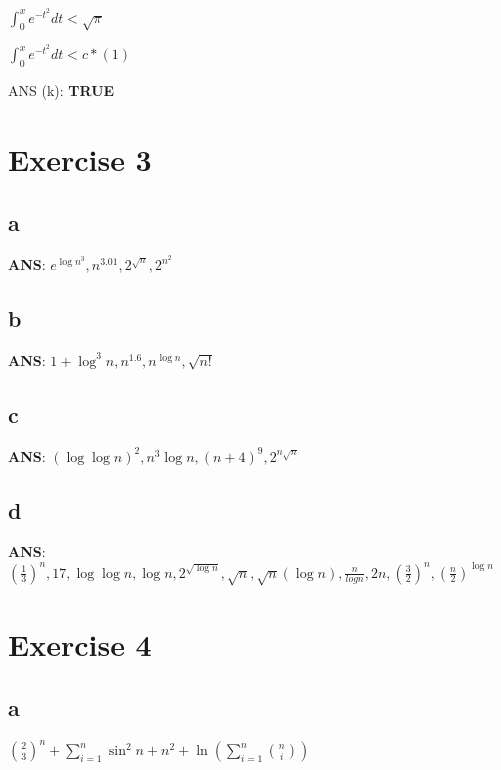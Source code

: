\documentclass[
]{article}
\begin{document}
\(\int_{0}^x e^{-t^2}dt < \sqrt{\pi}\)

\(\int_{0}^x e^{-t^2}dt < c*(1)\)

ANS (k): \textbf{TRUE}

\hypertarget{exercise-3}{%
\section{Exercise 3}\label{exercise-3}}

\hypertarget{a-2}{%
\subsection{a}\label{a-2}}

\textbf{ANS}: \({e^{\log{n^3}}}, n{^{3.01}}, 2^{\sqrt{n}},{2^{n^2}}\)

\hypertarget{b-2}{%
\subsection{b}\label{b-2}}

\textbf{ANS}: \(1+{\log^3{n}},{n^{{1.6}}},{n^{\log n}},{\sqrt{n!}}\)

\hypertarget{c-1}{%
\subsection{c}\label{c-1}}

\textbf{ANS}: \({(\log\log n)^2}, n^3\log{n}, (n+4)^9, 2^{n\sqrt{n}}\)

\hypertarget{d-1}{%
\subsection{d}\label{d-1}}

\textbf{ANS}:
\(({\frac{1}{3}})^n, 17, {\log \log n}, {\log n}, 2^{\sqrt{\log n}} ,{\sqrt{n}}, {{\sqrt{n}}{(\log n)}}, {\frac{n}{logn}}, 2n, {{(\frac{3}{2})}^n},(\frac{n}{2})^{\log n}\)

\hypertarget{exercise-4}{%
\section{Exercise 4}\label{exercise-4}}

\hypertarget{a-3}{%
\subsection{a}\label{a-3}}

\(\binom{2}{3}^n+\sum_{i=1}^n{\sin^2 n}+n^2+\ln{(\sum_{i=1}^n{\binom{n}{i}})}\)
\end{document}

